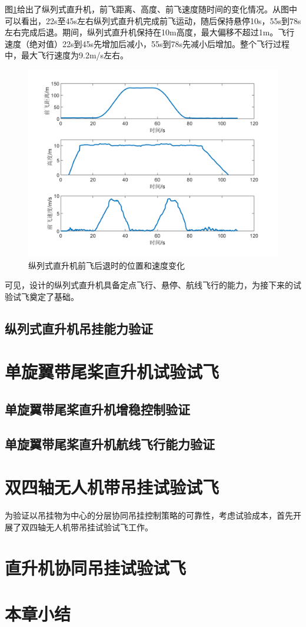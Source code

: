 图\ref{fig:chap7:cruise}给出了纵列式直升机，前飞距离、高度、前飞速度随时间的变化情况。从图中可以看出，22s至45s左右纵列式直升机完成前飞运动，随后保持悬停10s，55s到78s左右完成后退。期间，纵列式直升机保持在10m高度，最大偏移不超过1m。飞行速度（绝对值）22s到45s先增加后减小，55s到78s先减小后增加。整个飞行过程中，最大飞行速度为9.2m/s左右。
\begin{figure}[htb!]
    \centering
    \includegraphics[width = 14cm]{fig/figure_chap7/cruise.png}
    \caption{纵列式直升机前飞后退时的位置和速度变化\label{fig:chap7:cruise}}
\end{figure}

可见，设计的纵列式直升机具备定点飞行、悬停、航线飞行的能力，为接下来的试验试飞奠定了基础。

\subsection{纵列式直升机吊挂能力验证}
\section{单旋翼带尾桨直升机试验试飞}
\subsection{单旋翼带尾桨直升机增稳控制验证}
\subsection{单旋翼带尾桨直升机航线飞行能力验证}
\section{双四轴无人机带吊挂试验试飞}
为验证以吊挂物为中心的分层协同吊挂控制策略的可靠性，考虑试验成本，首先开展了双四轴无人机带吊挂试验试飞工作。
\section{直升机协同吊挂试验试飞}
\section{本章小结}
                                                                                       